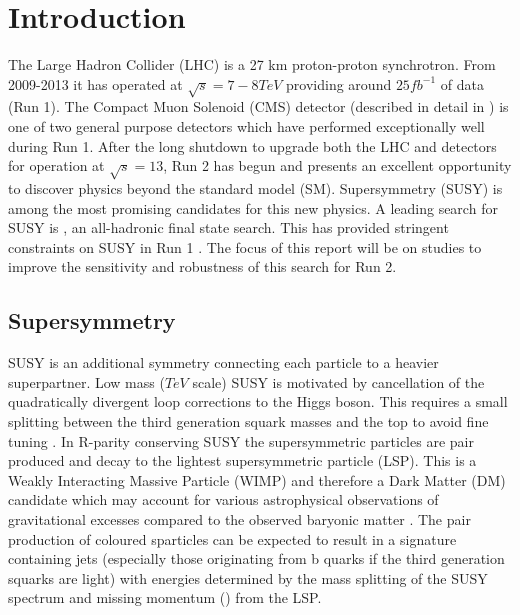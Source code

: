 
\chapter{Introduction} %

\label{Chapter1} %


The Large Hadron Collider (LHC) is a 27 km proton-proton synchrotron. 
From 2009-2013 it has operated at $\sqrt{s}=7-8TeV$ providing around $25fb^{-1}$ of data (Run 1). The Compact Muon Solenoid (CMS) detector (described in detail in \cite{CMSTDR}) is one of two general purpose detectors which have performed exceptionally well during Run 1.  After the long shutdown to upgrade both the LHC and detectors for operation at $\sqrt{s}=13$, Run 2 has begun and presents an excellent opportunity to discover physics beyond the standard model (SM).
Supersymmetry (SUSY) is among the most promising candidates for this new physics. A leading search for SUSY is \alphat, an all-hadronic final state search. This has provided stringent constraints on SUSY in Run 1 \cite{CMSAT8}. The focus of this report will be on studies to improve the sensitivity and robustness of this search for Run 2.

\section {Supersymmetry}
SUSY is an additional symmetry connecting each particle to a heavier superpartner. 
Low mass ($TeV$ scale) SUSY is motivated by cancellation of the quadratically divergent loop corrections to the Higgs boson. 
This requires a small splitting between the third generation squark masses and the top to avoid fine tuning 
\cite{naturalness}. 
In R-parity conserving SUSY \cite{susywimp} the supersymmetric particles are pair produced and 
decay to the lightest supersymmetric particle (LSP). This is a Weakly Interacting Massive Particle (WIMP) and therefore a Dark Matter (DM) candidate which may account for
 various astrophysical observations of gravitational excesses compared to the observed baryonic matter
\cite{dm}. The pair production of coloured sparticles
can be expected to result in a signature containing
jets (especially those originating from b quarks if the third
generation squarks are light) 
with energies determined by the mass splitting of the
SUSY spectrum and missing momentum (\met) from the LSP.  

